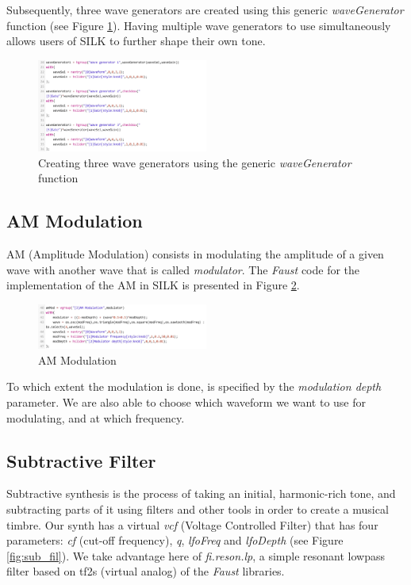 \documentclass{aes2e}
\begin{document}
Subsequently, three wave generators are created using this generic \textit{waveGenerator} function (see Figure \ref{fig:wavegens}). Having multiple wave generators to use simultaneously allows users of SILK to further shape their own tone.

\begin{figure}[h]
\centering
\includegraphics[width=0.5\textwidth]{Figures/wavegens.jpg}
\caption{Creating three wave generators using the generic \textit{waveGenerator} function}
\label{fig:wavegens}
\end{figure}


\subsection{AM Modulation}
AM (Amplitude Modulation) consists in modulating the amplitude of a given wave with another wave that is called \textit{modulator}. The \textit{Faust} code for the implementation of the AM in SILK is presented in Figure \ref{fig:am_mod}. 

\begin{figure}[h]
\centering
\includegraphics[width=0.5\textwidth]{Figures/am_mod.jpg}
\caption{AM Modulation}
\label{fig:am_mod}
\end{figure}

To which extent the modulation is done, is specified by the \textit{modulation depth} parameter. We are also able to choose which waveform we want to use for modulating, and at which frequency.

\subsection{Subtractive Filter}
Subtractive synthesis is the process of taking an initial, harmonic-rich tone, and subtracting parts of it using filters and other tools in order to create a musical timbre\cite{SUBT}. Our synth has a virtual \textit{vcf} (Voltage Controlled Filter) that has four parameters: \textit{cf} (cut-off frequency), \textit{q}, \textit{lfoFreq} and \textit{lfoDepth} (see Figure \ref{fig:sub_fil}). We take advantage here of \textit{fi.reson.lp}, a simple resonant lowpass filter based on tf2s (virtual analog) of the \textit{Faust} libraries.
\end{document}
